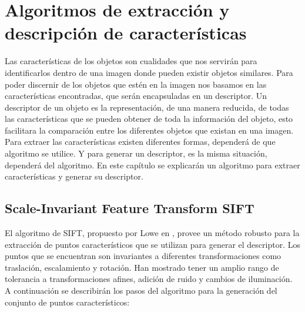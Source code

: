  \chapter{ Algoritmos de extracción y descripción de características}
 
Las características de los objetos son cualidades que nos servirán para identificarlos dentro de una imagen donde pueden existir objetos similares. Para poder discernir de los objetos que estén en la imagen nos basamos en las características encontradas, que serán encapsuladas en un descriptor. Un descriptor de un objeto es la representación, de una manera reducida, de todas las características que se pueden obtener de toda la información del objeto, esto facilitara la comparación entre los diferentes objetos que existan en una imagen.
Para extraer las características existen diferentes formas, dependerá de que algoritmo se utilice. Y para generar un descriptor, es la misma situación, dependerá del algoritmo. En este capítulo se explicarán un algoritmo para extraer características y generar su descriptor.   

\section{Scale-Invariant Feature Transform SIFT}
	El algoritmo de SIFT, propuesto por Lowe en \cite{Lowe2004},  provee un método robusto para la extracción de puntos característicos que se utilizan para generar el descriptor. Los puntos que se encuentran son invariantes a diferentes transformaciones como traslación, escalamiento y rotación. Han mostrado tener un amplio rango de tolerancia a transformaciones afines, adición de ruido y cambios de iluminación. A continuación se describirán los pasos del algoritmo para la generación del conjunto de puntos característicos:
\pagebreak
